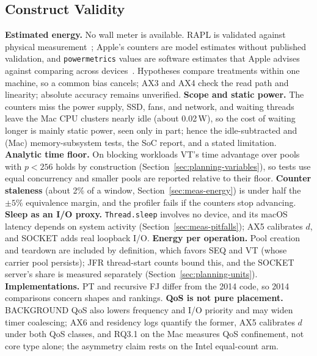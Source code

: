 \subsection{Construct Validity}
\textbf{Estimated energy.} No wall meter is available. RAPL is validated against physical measurement~\cite{khan2018rapl}; Apple's counters are model estimates without published validation, and \texttt{powermetrics} values are software estimates that Apple advises against comparing across devices~\cite{hubner2025apple}. Hypotheses compare treatments within one machine, so a common bias cancels; AX3 and AX4 check the read path and linearity; absolute accuracy remains unverified.
\textbf{Scope and static power.} The counters miss the power supply, SSD, fans, and network, and waiting threads leave the Mac CPU clusters nearly idle (about 0.02\,W), so the cost of waiting longer is mainly static power, seen only in part; hence the idle-subtracted and (Mac) memory-subsystem tests, the SoC report, and a stated limitation.
\textbf{Analytic time floor.} On blocking workloads VT's time advantage over pools with $p < 256$ holds by construction (Section~\ref{sec:planning-variables}), so tests use equal concurrency and smaller pools are reported relative to their floor.
\textbf{Counter staleness} (about 2\% of a window, Section~\ref{sec:meas-energy}) is under half the $\pm 5\%$ equivalence margin, and the profiler fails if the counters stop advancing.
\textbf{Sleep as an I/O proxy.} \texttt{Thread.sleep} involves no device, and its macOS latency depends on system activity (Section~\ref{sec:meas-pitfalls}); AX5 calibrates $d$, and SOCKET adds real loopback I/O.
\textbf{Energy per operation.} Pool creation and teardown are included by definition, which favors SEQ and VT (whose carrier pool persists); JFR thread-start counts bound this, and the SOCKET server's share is measured separately (Section~\ref{sec:planning-units}). 
\textbf{Implementations.} PT and recursive FJ differ from the 2014 code, so 2014 comparisons concern shapes and rankings.
\textbf{QoS is not pure placement.} BACKGROUND QoS also lowers frequency and I/O priority and may widen timer coalescing; AX6 and residency logs quantify the former, AX5 calibrates $d$ under both QoS classes, and RQ3.1 on the Mac measures QoS confinement, not core type alone; the asymmetry claim rests on the Intel equal-count arm. 

